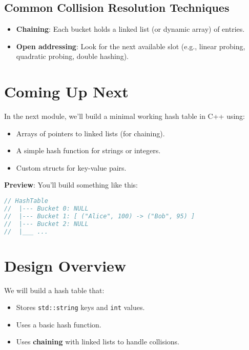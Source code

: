 \documentclass{article}
\begin{document}
\subsection*{Common Collision Resolution Techniques}

\begin{itemize}
    \item \textbf{Chaining}: Each bucket holds a linked list (or dynamic array) of entries.
    \item \textbf{Open addressing}: Look for the next available slot (e.g., linear probing, quadratic probing, double hashing).
\end{itemize}

\section*{Coming Up Next}

In the next module, we'll build a minimal working hash table in C++ using:
\begin{itemize}
    \item Arrays of pointers to linked lists (for chaining).
    \item A simple hash function for strings or integers.
    \item Custom structs for key-value pairs.
\end{itemize}

\textbf{Preview}: You’ll build something like this:

\begin{lstlisting}[language=C++]
// HashTable
//  |--- Bucket 0: NULL
//  |--- Bucket 1: [ ("Alice", 100) -> ("Bob", 95) ]
//  |--- Bucket 2: NULL
//  |___ ...
\end{lstlisting}

\maketitle

\section*{Design Overview}

We will build a hash table that:
\begin{itemize}
    \item Stores \texttt{std::string} keys and \texttt{int} values.
    \item Uses a basic hash function.
    \item Uses \textbf{chaining} with linked lists to handle collisions.
\end{itemize}
\end{document}
